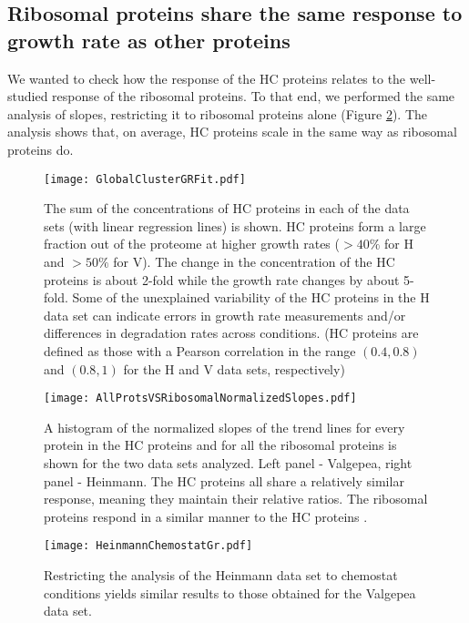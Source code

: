\documentclass[a4paper,landscape,titlepage,17pt]{extarticle}
\begin{document}
\subsection*{Ribosomal proteins share the same response to growth rate as other proteins}
We wanted to check how the response of the HC proteins relates to the well-studied response of the ribosomal proteins.
To that end, we performed the same analysis of slopes, restricting it to ribosomal proteins alone (Figure \ref{fig:globalfit}).
The analysis shows that, on average, HC proteins scale in the same way as ribosomal proteins do.
\clearpage        

\begin{figure}[h]
\centering
\texttt{[image: GlobalClusterGRFit.pdf]}
\caption{\linespread{0.5}\selectfont{}
The sum of the concentrations of HC proteins in each of the data sets (with linear regression lines) is shown.
HC proteins form a large fraction out of the proteome at higher growth rates ($>40\%$ for H and $>50\%$ for V).
The change in the concentration of the HC proteins is about 2-fold while the growth rate changes by about 5-fold.
Some of the unexplained variability of the HC proteins in the H data set can indicate errors in growth rate measurements and/or differences in degradation rates across conditions.
(HC proteins are defined as those with a Pearson correlation in the range $(0.4,0.8)$ and $(0.8,1)$ for the H and V data sets, respectively)
}

\label{fig:globalgrcorr}
\end{figure}
\clearpage        
\begin{figure}[h]
\centering
\texttt{[image: AllProtsVSRibosomalNormalizedSlopes.pdf]}
\caption{\linespread{0.5}\selectfont{}
    A histogram of the normalized slopes of the trend lines for every protein in the HC proteins and for all the ribosomal proteins is shown for the two data sets analyzed.
    Left panel - Valgepea, right panel - Heinmann.
    The HC proteins all share a relatively similar response, meaning they maintain their relative ratios.
    The ribosomal proteins respond in a similar manner to the HC proteins .
}
\label{fig:globalfit}
\end{figure}
\clearpage        

\begin{figure}[h]
\centering
\texttt{[image: HeinmannChemostatGr.pdf]}
\caption{\linespread{0.5}\selectfont{}
  Restricting the analysis of the Heinmann data set to chemostat conditions yields similar results to those obtained for the Valgepea data set.
}
\label{fig:growthcorrchemo}
\end{figure}
\clearpage        
\end{document}
